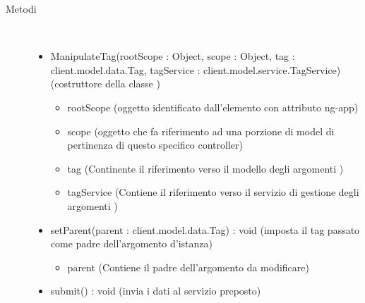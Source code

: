 \begin{description}
\item[Metodi] \hfill \\
 \vspace{-7mm}
\begin{itemize}
\item ManipulateTag(rootScope : Object, scope : Object, tag : client.model.data.Tag, tagService : client.model.service.TagService) (costruttore della classe )\begin{itemize}
\item rootScope (oggetto identificato dall’elemento con attributo ng-app)
\item scope (oggetto che fa riferimento ad una porzione di model di pertinenza di questo specifico controller)
\item tag (Continente il riferimento verso il modello degli argomenti )
\item tagService (Contiene il riferimento verso il servizio di gestione degli argomenti )
\end{itemize}

\item setParent(parent : client.model.data.Tag) : void (imposta il tag passato come padre dell'argomento d'istanza)\begin{itemize}
\item parent (Contiene il padre dell'argomento da modificare)
\end{itemize}

\item submit() : void (invia i dati al servizio preposto)
\end{itemize}

\end{description}

